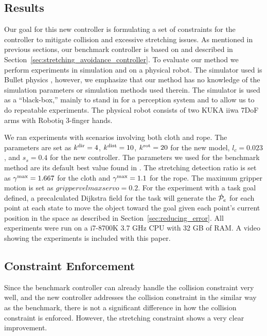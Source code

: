 
\subsection{Results}
\label{sec:stretching_constraint_controller_results}

Our goal for this new controller is formulating a set of constraints for the controller to mitigate collision and excessive stretching issues. As mentioned in previous sections, our benchmark controller is based on \cite{Berenson2013} and described in Section~\ref{sec:stretching_avoidance_controller}. To evaluate our method we perform experiments in simulation and on a physical robot. The simulator used is Bullet physics \cite{Coumans2010}, however, we emphasize that our method has no knowledge of the simulation parameters or simulation methods used therein. The simulator is used as a ``black-box,'' mainly to stand in for a perception system and to allow us to do repeatable experiments. The physical robot consists of two KUKA iiwa 7DoF arms with Robotiq 3-finger hands.


We ran experiments with scenarios involving both cloth and rope. The parameters are set as $k^\textrm{dir} = 4$, $k^\textrm{dist} = 10$, $k^{\textrm{rot}} = 20$ for the new model, $l_c = 0.023$, and $s_s = 0.4$ for the new controller. The parameters we used for the benchmark method are its default best value found in \cite{McConachie2018}. The stretching detection ratio is set as $\gamma^{\textrm{max}} = 1.667$ for the cloth and $\gamma^{\textrm{max}} = 1.1$ for the rope. The maximum gripper motion is set as $grippervelmaxservo = 0.2$. For the experiment with a task goal defined, a precalculated Dijkstra field for the task will generate the $\dot{\mathcal{P}}_e$ for each point at each state to move the object toward the goal given each point's current position in the space as described in Section~\ref{sec:reducing_error}. All experiments were run on a i7-8700K 3.7 GHz CPU with 32 GB of RAM. A video showing the experiments is included with this paper.


\subsection{Constraint Enforcement}
\label{Results: Object Stretching Avoidance}

Since the benchmark controller can already handle the collision constraint very well, and the new controller addresses the collision constraint in the similar way as the benchmark, there is not a significant difference in how the collision constraint is enforced. However, the stretching constraint shows a very clear improvement.

